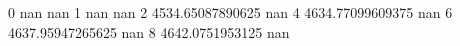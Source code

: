 0 nan nan
1 nan nan
2 4534.65087890625 nan
4 4634.77099609375 nan
6 4637.95947265625 nan
8 4642.0751953125 nan
